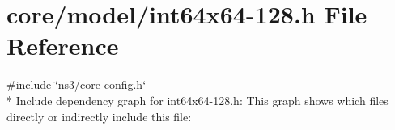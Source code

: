 \hypertarget{int64x64-128_8h}{}\section{core/model/int64x64-\/128.h File Reference}
\label{int64x64-128_8h}
{\ttfamily \#include \char`\"{}ns3/core-\/config.\+h\char`\"{}}\\*
Include dependency graph for int64x64-\/128.h\+:
This graph shows which files directly or indirectly include this file\+:
